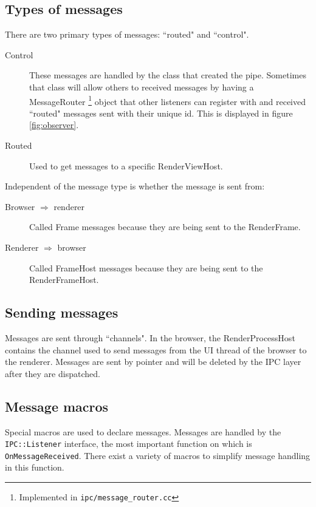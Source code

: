 \subsection{Types of messages}

There are two primary types of messages: ``routed" and ``control". 

\begin{description}
\item[Control] These messages are handled by the class that created the pipe. Sometimes that class will allow others to received messages by having a MessageRouter \footnote{Implemented in \texttt{ipc/message\_router.cc}} object that other listeners can register with and received ``routed" messages sent with their unique id. This is displayed in figure \ref{fig:observer}.

\item[Routed] Used to get messages to a specific RenderViewHost. 
\end{description}

\noindent Independent of the message type is whether the message is sent from:

\begin{description}
\item[Browser $\Longrightarrow$ renderer] Called Frame messages because they are being sent to the RenderFrame. 
\item[Renderer $\Longrightarrow$ browser] Called FrameHost messages because they are being sent to the RenderFrameHost.
\end{description}

\subsection{Sending messages}

Messages are sent through ``channels". In the browser, the RenderProcessHost contains the channel used to send messages from the UI thread of the browser to the renderer. Messages are sent by pointer and will be deleted by the IPC layer after they are dispatched.

\subsection{Message macros}

Special macros are used to declare messages. Messages are handled by the \texttt{IPC::Listener} interface, the most important function on which is \texttt{OnMessageReceived}. There exist a variety of macros to simplify message handling in this function.


